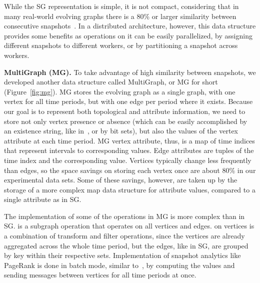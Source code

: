 While the SG representation is simple, it is not compact, considering
that in many real-world evolving graphs there is a 80\% or larger
similarity between consecutive
snapshots~\cite{DBLP:journals/tos/MiaoHLWYZPCC15}.  In a distributed
architecture, however, this data structure provides some benefits as
operations on it can be easily parallelized, by assigning different
snapshots to different workers, or by partitioning a snapshot across
workers.  

{\bf MultiGraph (MG).}  To take advantage of high similarity between
snapshots, we developed another data structure called MultiGraph, or
MG for short (Figure~\ref{fig:mg}).  MG stores the evolving graph as a
single graph, with one vertex for all time periods, but with one edge
per period where it exists.  Because our goal is to represent both
topological and attribute information, we need to store not only
vertex presence or absence (which can be easily accomplished by an
existence string, like in~\cite{Kan2009}, or by bit sets), but also
the values of the vertex attribute at each time period.  MG vertex
attribute, thus, is a map of time indices that represent intervals to
corresponding values.  Edge attributes are tuples of the time index
and the corresponding value.  Vertices typically change less
frequently than edges, so the space savings on storing each vertex
once are about 80\% in our experimental data sets.  Some of these
savings, however, are taken up by the storage of a more complex map
data structure for attribute values, compared to a single attribute as
in SG.  

The implementation of some of the \ql operations in MG is more complex
than in SG.   is a subgraph operation that operates on
all vertices and edges.   on vertices is a combination
of transform and filter operations, since the vertices are already
aggregated across the whole time period, but the edges, like in SG,
are grouped by key within their respective sets.  Implementation of
snapshot analytics like PageRank is done in batch mode, similar
to~\cite{DBLP:journals/tos/MiaoHLWYZPCC15}, by computing the values
and sending messages between vertices for all time periods at once.

